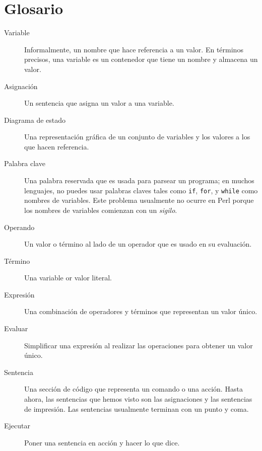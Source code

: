 \section{Glosario}

\begin{description}

\item[Variable]  Informalmente, un nombre que hace referencia a un valor. En términos
precisos, una variable es un contenedor que tiene un nombre y almacena un valor.

\item[Asignación]  Un sentencia que asigna un valor a una variable.

\item[Diagrama de estado]  Una representación gráfica de un conjunto de variables
y los valores a los que hacen referencia.

\item[Palabra clave]  Una palabra reservada que es usada para parsear
un programa; en muchos lenguajes, no puedes usar palabras claves tales como
{\tt if}, {\tt  for}, y {\tt while} como nombres de variables.
Este problema usualmente no ocurre en Perl porque los nombres de variables
comienzan con un \emph{sigilo}.

\item[Operando] Un valor o término al lado de un operador que es usado
en su evaluación.

\item[Término]  Una variable or valor literal.

\item[Expresión]  Una combinación de operadores y términos que 
representan un valor único.

\item[Evaluar]  Simplificar una expresión al realizar las operaciones 
para obtener un valor único.

\item[Sentencia]  Una sección de código que representa un comando o una acción. Hasta ahora,
las sentencias que hemos visto son las asignaciones y las sentencias de impresión. Las sentencias
usualmente terminan con un punto y coma.

\item[Ejecutar]  Poner una sentencia en acción y hacer lo que dice.


\end{description}

